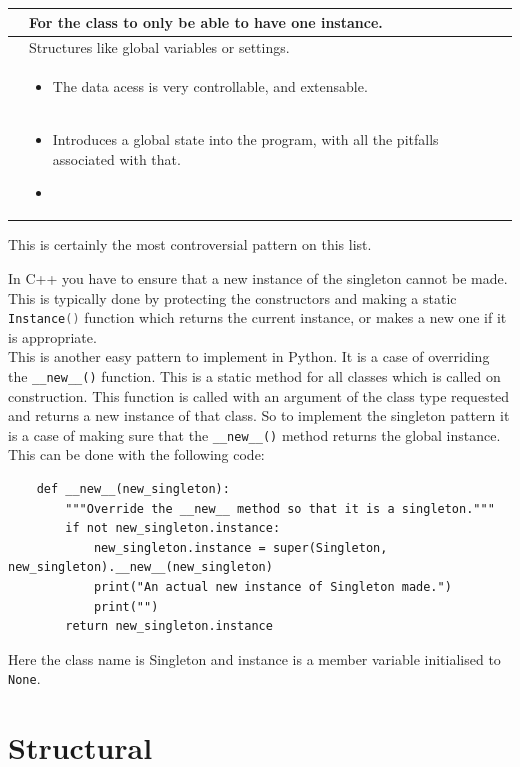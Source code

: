 \documentclass[12pt, oneside]{book} %
\newcommand{\HRule}{\rule{\linewidth}{0.5mm}} %
\newcommand{\tmpsection}[1]{}
\let\tmpsection=\section
\renewcommand{\section}[1]{
  { 
    \samepage{
      \vspace{10 mm} \linespread{0.75} \color{RoyalBlue}{
        \noindent \HRule \tmpsection{#1} \noindent \HRule
      }
    }
  }
}
\newcommand{\patternSummaryGoalMotProCon}[4]{
  \begin{center}
    \begin{tabular}{|l|p{12cm} |}
      \hline
      \color{RoyalBlue}{Goal} & #1
      \\
      \hline
      \color{RoyalBlue}{Motivation} & #2
      \\ 
      \hline
      \color{RoyalBlue}{Pros} & #3
      \\ 
      \hline
      \color{RoyalBlue}{Cons} & #4
      \\ 
      \hline
    \end{tabular}
  \end{center}
}
\begin{document}
\section{Singleton}
\patternSummaryGoalMotProCon{
For the class to only be able to have one instance.
}
{
Structures like global variables or settings.
}
{
\begin{itemize}
\item The data acess is very controllable, and extensable.
\end{itemize}
}
{
\begin{itemize}
\item Introduces a global state into the program, with all the pitfalls associated with that.
\item 
\end{itemize}
}

This is certainly the most controversial pattern on this list. 

In C++ you have to ensure that a new instance of the singleton cannot be made. This is typically done by protecting the constructors and making a static \lstinline[language = c++]{Instance()} function which returns the current instance, or makes a new one if it is appropriate. \\

This is another easy pattern to implement in Python. It is a case of overriding the \lstinline{__new__()} function. This is a static method for all classes which is called on construction. This function is called with an argument of the class type requested and returns a new instance of that class. So to implement the singleton pattern it is a case of making sure that the \lstinline{__new__()} method returns the global instance. This can be done with the following code:
\begin{lstlisting}
    def __new__(new_singleton):
        """Override the __new__ method so that it is a singleton."""
        if not new_singleton.instance:
            new_singleton.instance = super(Singleton, new_singleton).__new__(new_singleton)
            print("An actual new instance of Singleton made.")
            print("")
        return new_singleton.instance
\end{lstlisting}
Here the class name is Singleton and instance is a member variable initialised to \lstinline{None}.

\chapter{Structural}
\end{document}
